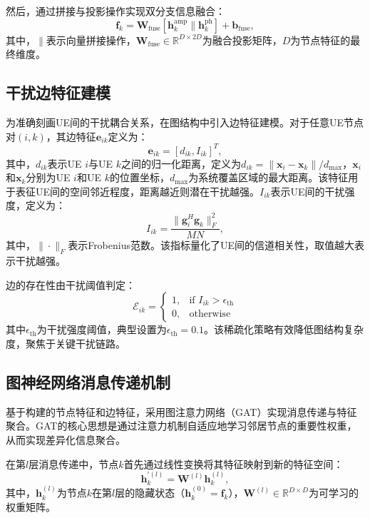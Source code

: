 然后，通过拼接与投影操作实现双分支信息融合：
\begin{equation}
\mathbf{f}_{k} = \mathbf{W}_{\text{fuse}} \left[\mathbf{h}_{k}^{\text{amp}} \| \mathbf{h}_{k}^{\text{ph}}\right] + \mathbf{b}_{\text{fuse}},
\end{equation}
其中，$\|$表示向量拼接操作，$\mathbf{W}_{\text{fuse}} \in \mathbb{R}^{D \times 2D}$为融合投影矩阵，$D$为节点特征的最终维度。

\subsection{干扰边特征建模}
为准确刻画UE间的干扰耦合关系，在图结构中引入边特征建模。对于任意UE节点对$(i, k)$，其边特征$\mathbf{e}_{ik}$定义为：
\begin{equation}
\mathbf{e}_{ik} = \left[d_{ik}, I_{ik}\right]^{T},
\end{equation}
其中，$d_{ik}$表示UE $i$与UE $k$之间的归一化距离，定义为$d_{ik} = \|\mathbf{x}_{i} - \mathbf{x}_{k}\| / d_{\max}$，$\mathbf{x}_{i}$和$\mathbf{x}_{k}$分别为UE $i$和UE $k$的位置坐标，$d_{\max}$为系统覆盖区域的最大距离。该特征用于表征UE间的空间邻近程度，距离越近则潜在干扰越强。$I_{ik}$表示UE间的干扰强度，定义为：
\begin{equation}
I_{ik} = \frac{\|\mathbf{g}_{i}^{H}\mathbf{g}_{k}\|_{F}^{2}}{MN},
\end{equation}
其中，$\|\cdot\|_{F}$表示Frobenius范数。该指标量化了UE间的信道相关性，取值越大表示干扰越强。

边的存在性由干扰阈值判定：
\begin{equation}
\mathcal{E}_{ik} = \begin{cases}
1, & \text{if } I_{ik} > \epsilon_{\text{th}} \\
0, & \text{otherwise}
\end{cases}
\end{equation}
其中$\epsilon_{\text{th}}$为干扰强度阈值，典型设置为$\epsilon_{\text{th}}=0.1$。该稀疏化策略有效降低图结构复杂度，聚焦于关键干扰链路。

\subsection{图神经网络消息传递机制}
基于构建的节点特征和边特征，采用图注意力网络（GAT）实现消息传递与特征聚合。GAT的核心思想是通过注意力机制自适应地学习邻居节点的重要性权重，从而实现差异化信息聚合。

在第$l$层消息传递中，节点$k$首先通过线性变换将其特征映射到新的特征空间：
\begin{equation}
\mathbf{h}_{k}^{\prime(l)} = \mathbf{W}^{(l)}\mathbf{h}_{k}^{(l)},
\end{equation}
其中，$\mathbf{h}_{k}^{(l)}$为节点$k$在第$l$层的隐藏状态（$\mathbf{h}_{k}^{(0)} = \mathbf{f}_{k}$），$\mathbf{W}^{(l)} \in \mathbb{R}^{D \times D}$为可学习的权重矩阵。

